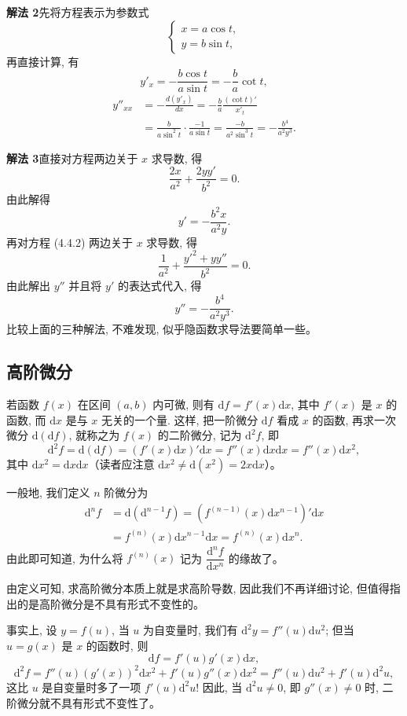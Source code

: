 \documentclass[UTF8,12pt,a4paper,fontset=fandol]{ctexart}
\begin{document}
\noindent\textbf{解法 2}\quad 先将方程表示为参数式
\[
  \begin{cases}
    x=a\cos t,\\
    y=b\sin t,
  \end{cases}
\]
再直接计算, 有
\[
  y'_x=-\frac{b\cos t}{a\sin t}=-\frac{b}{a}\cot t,
\]
\[
\begin{aligned}
  y''_{xx}
  &=
  -\frac{d(y'_x)}{dx}
  =
  -\frac{b}{a}\frac{(\cot t)'}{x'_t}  \\
  &=
  \frac{b}{a\sin^2t}\cdot\frac{-1}{a\sin t}
  =
  \frac{-b}{a^2\sin^3t}
  =
  -\frac{b^4}{a^2y^3}.
\end{aligned}
\]

\noindent\textbf{解法 3}\quad 直接对方程两边关于 $x$ 求导数, 得
\[
  \frac{2x}{a^2}+\frac{2yy'}{b^2}=0. \tag{4.4.2}
\]
由此解得
\[
  y'=-\frac{b^2x}{a^2y}.
\]
再对方程 (4.4.2) 两边关于 $x$ 求导数, 得
\[
  \frac1{a^2}+\frac{y'^2+yy''}{b^2}=0.
\]
由此解出 $y''$ 并且将 $y'$ 的表达式代入, 得
\[
  y''=-\frac{b^4}{a^2y^3}.
\]
比较上面的三种解法, 不难发现, 似乎隐函数求导法要简单一些。

\subsection{高阶微分}

若函数 $f(x)$ 在区间 $(a,b)$ 内可微, 则有 $\mathrm df=f'(x)\mathrm dx$, 其中 $f'(x)$ 是 $x$ 的函数, 而 $\mathrm dx$ 是与 $x$ 无关的一个量. 这样, 把一阶微分 $\mathrm df$ 看成 $x$ 的函数, 再求一次微分 $\mathrm d(\mathrm df)$, 就称之为 $f(x)$ 的二阶微分, 记为 $\mathrm d^2f$, 即
\[
  \mathrm d^2f
  =
  \mathrm d(\mathrm df)
  =
  (f'(x)\mathrm dx)'\mathrm dx
  =
  f''(x)\mathrm dx\mathrm dx
  =
  f''(x)\mathrm dx^2,
\]
其中 $\mathrm dx^2=\mathrm dx\mathrm dx$（读者应注意 $\mathrm dx^2\ne \mathrm d(x^2)=2x\mathrm dx$）。

一般地, 我们定义 $n$ 阶微分为
\[
\begin{aligned}
  \mathrm d^nf
  &=
  \mathrm d(\mathrm d^{n-1}f)
  =
  (f^{(n-1)}(x)\mathrm dx^{n-1})'\mathrm dx  \\
  &=
  f^{(n)}(x)\mathrm dx^{n-1}\mathrm dx
  =
  f^{(n)}(x)\mathrm dx^n.
\end{aligned}
\]
由此即可知道, 为什么将 $f^{(n)}(x)$ 记为 $\dfrac{\mathrm d^nf}{\mathrm dx^n}$ 的缘故了。

由定义可知, 求高阶微分本质上就是求高阶导数, 因此我们不再详细讨论, 但值得指出的是高阶微分是不具有形式不变性的。

事实上, 设 $y=f(u)$, 当 $u$ 为自变量时, 我们有 $\mathrm d^2y=f''(u)\mathrm du^2$; 但当 $u=g(x)$ 是 $x$ 的函数时, 则
\[
  \mathrm df=f'(u)g'(x)\mathrm dx,
\]
\[
  \mathrm d^2f
  =
  f''(u)(g'(x))^2\mathrm dx^2+f'(u)g''(x)\mathrm dx^2
  =
  f''(u)\mathrm du^2+f'(u)\mathrm d^2u,
\]
这比 $u$ 是自变量时多了一项 $f'(u)\mathrm d^2u$! 因此, 当 $\mathrm d^2u\ne0$, 即 $g''(x)\ne0$ 时, 二阶微分就不具有形式不变性了。
\end{document}
